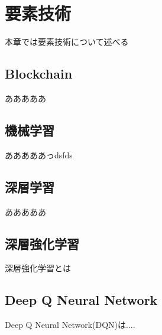 \chapter{要素技術}
\label{technical_background}

本章では要素技術について述べる

\section{Blockchain}

あああああ

\section{機械学習}

あああああっdsfds

\section{深層学習}

あああああ

\section{深層強化学習}

深層強化学習とは

\section{Deep Q Neural Network}

Deep Q Neural Network(DQN)は....



